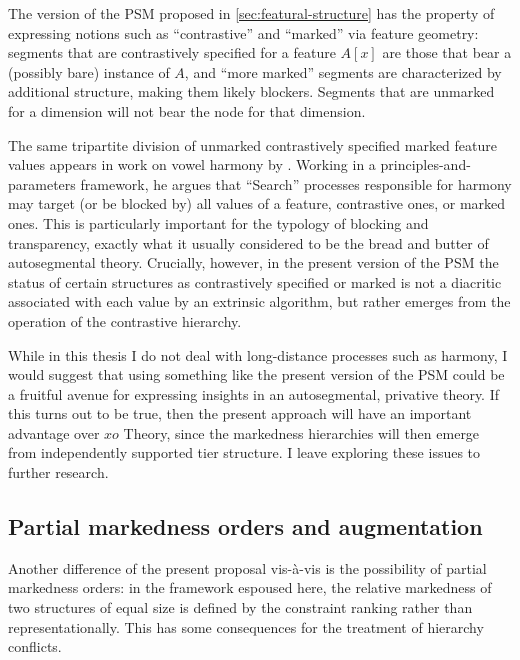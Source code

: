 The version of the PSM proposed in \cref{sec:featural-structure} has the property of expressing notions such as \enquote{contrastive} and \enquote{marked} via feature geometry: segments that are contrastively specified for a feature $A[x]$ are those that bear a (possibly bare) instance of $A$, and \enquote{more marked} segments are characterized by additional structure, making them likely blockers. Segments that are unmarked for a dimension will not bear the node for that dimension.

The same tripartite division of unmarked \vs contrastively specified \vs marked feature values appears in work on vowel harmony by \citet{nevins10:_local}. Working in  a principles\hyp and\hyp parameters framework, he argues that \enquote{Search} processes responsible for harmony may target (or be blocked by) all values of a feature, contrastive ones, or marked ones. This is particularly important for the typology of blocking and transparency, \ie exactly what it usually considered to be the bread and butter of autosegmental theory. Crucially, however, in the present version of the PSM the status of certain structures as contrastively specified or marked is not a diacritic associated with each value by an extrinsic algorithm, but rather emerges from the operation of the contrastive hierarchy.

While in this thesis I do not deal with long\hyp distance processes such as harmony, I would suggest that using something like the present version of the PSM could be a fruitful avenue for expressing  insights in an autosegmental, privative theory. If this turns out to be true, then the present approach will have an important advantage over  $xo$ Theory, since the markedness hierarchies will then emerge from independently supported tier structure. I leave exploring these issues to further research.

\subsection{Partial markedness orders and augmentation}
\label{sec:part-mark-orders}

Another difference of the present proposal vis-à-vis  is the possibility of partial markedness orders: in the framework espoused here, the relative markedness of two structures of equal size is defined by the constraint ranking rather than representationally. This has some consequences for the treatment of hierarchy conflicts.

